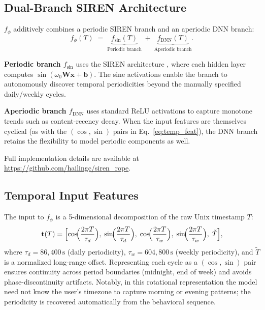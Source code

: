 \documentclass{article}
\begin{document}
\subsection{Dual-Branch SIREN Architecture}
\label{sec:siren_arch}

$f_\phi$ additively combines a periodic SIREN branch and an aperiodic DNN branch:
\begin{equation}
  f_\phi(T) \;=\;
    \underbrace{f_{\mathrm{sin}}(T)}_{\text{Periodic branch}}
    \;+\;
    \underbrace{f_{\mathrm{DNN}}(T)}_{\text{Aperiodic branch}}.
  \label{eq:dual_branch}
\end{equation}

\textbf{Periodic branch $f_{\mathrm{sin}}$} uses the SIREN architecture \citep{sitzmann2020siren},
where each hidden layer computes $\sin(\omega_0 \mathbf{W}\mathbf{x} + \mathbf{b})$.
The sine activations enable the branch to
autonomously discover temporal periodicities beyond the manually specified daily/weekly cycles.

\textbf{Aperiodic branch $f_{\mathrm{DNN}}$} uses standard ReLU activations to capture monotone trends such as content-recency
decay. When the input features are themselves cyclical (as with the $(\cos,\sin)$ pairs in Eq.~\eqref{eq:temp_feat}), the DNN branch
retains the flexibility to model periodic components as well.

Full implementation details are available at \url{https://github.com/hailingc/siren_rope}.

\subsection{Temporal Input Features}

The input to $f_\phi$ is a 5-dimensional decomposition of the raw
Unix timestamp $T$:
\begin{equation}
  \mathbf{t}(T) = \Bigl[
    \cos\!\Bigl(\frac{2\pi T}{\tau_d}\Bigr),\;
    \sin\!\Bigl(\frac{2\pi T}{\tau_d}\Bigr),\;
    \cos\!\Bigl(\frac{2\pi T}{\tau_w}\Bigr),\;
    \sin\!\Bigl(\frac{2\pi T}{\tau_w}\Bigr),\;
    \tilde{T}
  \Bigr],
  \label{eq:temp_feat}
\end{equation}
where $\tau_d = 86{,}400\,\mathrm{s}$ (daily periodicity), $\tau_w =
604{,}800\,\mathrm{s}$ (weekly periodicity), and $\tilde{T}$ is a normalized
long-range offset. Representing each cycle as a $(\cos, \sin)$ pair ensures
continuity across period boundaries (midnight, end of week) and avoids
phase-discontinuity artifacts. Notably, in this rotational representation the model need not know the user's timezone to capture morning or evening patterns; the periodicity is recovered automatically from the behavioral sequence.
\end{document}
